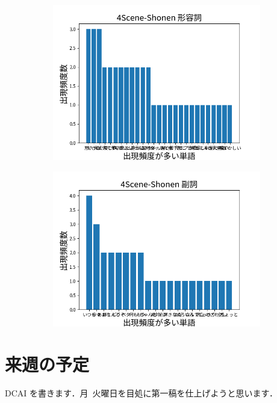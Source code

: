 \documentclass[onecolumn]{ujarticle}   %
\begin{document}
\begin{figure}[hb]
\begin{subfigure}{0.49\columnwidth}
			\includegraphics[width=1.0\columnwidth]{data/keiyosi_4Scene-Shonen.png}
		\end{subfigure}
		\begin{subfigure}{0.49\columnwidth}
			\centering
			\includegraphics[width=1.0\columnwidth]{data/hukusi_4Scene-Shonen.png}
		\end{subfigure}
		\label{fig:histgram3}
	\end{figure}

	\section{来週の予定}\noindent
	DCAI を書きます．月~火曜日を目処に第一稿を仕上げようと思います．
\end{document}
